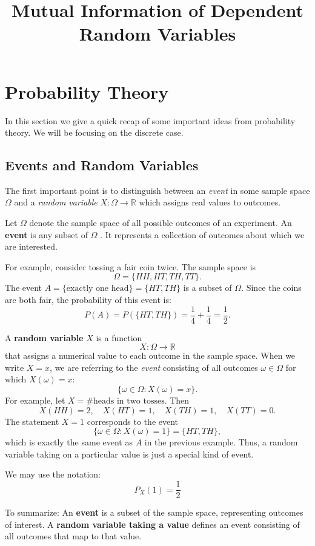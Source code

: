 \documentclass[11pt]{article}
\title{Mutual Information of Dependent Random Variables}
\author{}
\date{}
\begin{document}
\maketitle

\Large

\section{Probability Theory}

In this section we give a quick recap of some important ideas from probability theory. We will be focusing on the discrete case.

\subsection{Events and Random Variables}


The first important point is to distinguish between an \emph{event} in some sample space $\Omega$ and a \emph{random variable} $X: \Omega \to \mathbb{R}$ which assigns real values to outcomes.


Let $\Omega$ denote the sample space of all possible outcomes of an experiment. An \textbf{event} is any subset of $\Omega$ . It represents a collection of outcomes about which we are interested. 

For example, consider tossing a fair coin twice. The sample space is
\[
\Omega = \{ HH, HT, TH, TT \}.
\]
The event
$
A = \{\text{exactly one head}\} = \{ HT, TH \}
$
is a subset of $\Omega$. Since the coins are both fair, the probability of this event is:
\[
P(A) = P(\{HT, TH\}) = \frac{1}{4} + \frac{1}{4} = \frac{1}{2}.
\]

A \textbf{random variable} $X$ is a function
\[
X : \Omega \to \mathbb{R}
\]
that assigns a numerical value to each outcome in the sample space. When we write $X = x$, we are referring to the \emph{event} consisting of all outcomes $\omega \in \Omega$ for which $X(\omega) = x$:
\[
\{ \omega \in \Omega : X(\omega) = x \}.
\]
For example, let $X = \#\text{heads in two tosses}$. Then
\[
X(HH) = 2, \quad X(HT) = 1, \quad X(TH) = 1, \quad X(TT) = 0.
\]
The statement $X = 1$ corresponds to the event
\[
\{\omega \in \Omega : X(\omega) = 1\} = \{ HT, TH \},
\]
which is exactly the same event as $A$ in the previous example. Thus, a random variable taking on a particular value is just a special kind of event.

We may use the notation: \[P_X(1) = \frac{1}{2}\]

To summarize: An \textbf{event} is a subset of the sample space, representing outcomes of interest. A \textbf{random variable taking a value} defines an event consisting of all outcomes that map to that value. 
\end{document}
